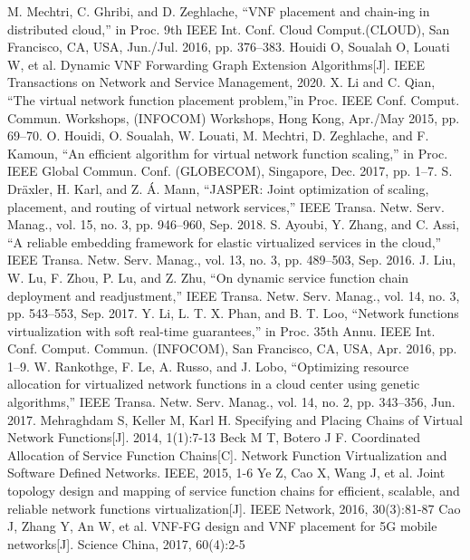 \begin{thebibliography}{9}
     M. Mechtri, C. Ghribi, and D. Zeghlache, “VNF placement and chain-ing in distributed cloud,” in Proc. 9th IEEE Int. Conf. Cloud Comput.(CLOUD), San Francisco, CA, USA, Jun./Jul. 2016, pp. 376–383.
     Houidi O, Soualah O, Louati W, et al. Dynamic VNF Forwarding Graph Extension Algorithms[J]. IEEE Transactions on Network and Service Management, 2020.
     X. Li and C. Qian, “The virtual network function placement problem,”in Proc. IEEE Conf. Comput. Commun. Workshops, (INFOCOM) Workshops, Hong Kong, Apr./May 2015, pp. 69–70.
     	O. Houidi, O. Soualah, W. Louati, M. Mechtri, D. Zeghlache, and F. Kamoun, “An efficient algorithm for virtual network function scaling,” in Proc. IEEE Global Commun. Conf. (GLOBECOM), Singapore, Dec. 2017, pp. 1–7.
     S. Dräxler, H. Karl, and Z. Á. Mann, “JASPER: Joint optimization of scaling, placement, and routing of virtual network services,” IEEE Transa. Netw. Serv. Manag., vol. 15, no. 3, pp. 946–960, Sep. 2018.
     	S. Ayoubi, Y. Zhang, and C. Assi, “A reliable embedding framework for elastic virtualized services in the cloud,” IEEE Transa. Netw. Serv. Manag., vol. 13, no. 3, pp. 489–503, Sep. 2016.
     	J. Liu, W. Lu, F. Zhou, P. Lu, and Z. Zhu, “On dynamic service function chain deployment and readjustment,” IEEE Transa. Netw. Serv. Manag., vol. 14, no. 3, pp. 543–553, Sep. 2017.
     	Y. Li, L. T. X. Phan, and B. T. Loo, “Network functions virtualization with soft real-time guarantees,” in Proc. 35th Annu. IEEE Int. Conf. Comput. Commun. (INFOCOM), San Francisco, CA, USA, Apr. 2016, pp. 1–9.
     	W. Rankothge, F. Le, A. Russo, and J. Lobo, “Optimizing resource allocation for virtualized network functions in a cloud center using genetic algorithms,” IEEE Transa. Netw. Serv. Manag., vol. 14, no. 2, pp. 343–356, Jun. 2017.
     	Mehraghdam S, Keller M, Karl H. Specifying and Placing Chains of Virtual Network Functions[J]. 2014, 1(1):7-13
     	Beck M T, Botero J F. Coordinated Allocation of Service Function Chains[C]. Network Function Virtualization and Software Defined Networks. IEEE, 2015, 1-6
     	Ye Z, Cao X, Wang J, et al. Joint topology design and mapping of service function chains for efficient, scalable, and reliable network functions virtualization[J]. IEEE Network, 2016, 30(3):81-87
     	Cao J, Zhang Y, An W, et al. VNF-FG design and VNF placement for 5G mobile networks[J]. Science China, 2017, 60(4):2-5

\end{thebibliography}
